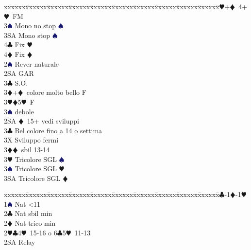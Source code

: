 \documentclass[a4paper,italian]{article}
\newcommand{\BC}{\textcolor{OliveGreen}{$\clubsuit$}}
\newcommand{\BD}{\textcolor{RedOrange}{$\vardiamondsuit$}}
\newcommand{\BH}{\textcolor{Red2}{$\varheartsuit${}}}
\newcommand{\BS}{\textcolor{MidnightBlue}{$\spadesuit${}}}
\newenvironment{bidtable}
{\begin{tabbing}

    xxxxxx\=xxxxxx\=xxxxxx\=xxxxxx\=xxxxxx\=xxxxxx\=xxxxxx\=xxxxxx\=xxxxxx\=xxxxxx\=\kill}
{\end{tabbing} }%
\begin{document}
\begin{multicols}{2}
\begin{bidtable}
                                        3\BH {}+\BD\ 4+\BH\ FM\+\\
                                        3\BS \> Mono no stop \BS \\
                                        3SA \> Mono stop \BS \\
                                        4\BC \> Fix \BH \\
                                        4\BD \> Fix \BD \-\-\\
                                        2\BS \> Rever naturale\+\\
                                        2SA \> GAR\\
                                        3\BC \> S.O.\\
                                        3\BD {}+\BD\ colore molto bello F\\
                                        3\BH {}\BD 5\BH\ F\\
                                        3\BS \> debole\-\\
                                        2SA \BD\ 15+ vedi sviluppi\\
                                        3\BC \> Bel colore fino a 14 o settima\+\\
                                        3X \> Sviluppo fermi\-\\
                                        3\BD {}\BD\ sbil 13-14\\
                                        3\BH \> Tricolore SGL \BS \\
                                        3\BS \> Tricolore SGL \BH \\
                                        3SA \> Tricolore SGL \BD \-
                                    \end{bidtable}
                                    \begin{bidtable}
                                        1\BC-1\BD-1\BH\+\\
                                        1\BS \> Nat <11\+\\
                                        2\BC \> Nat sbil min\\
                                        2\BD \> Nat trico min\\
                                        2\BH {}\BC 4\BH\ 15-16 o 6\BC 5\BH\ 11-13\+\\
                                        2SA \> Relay\+\\

\end{bidtable}
\end{multicols}
\end{document}
